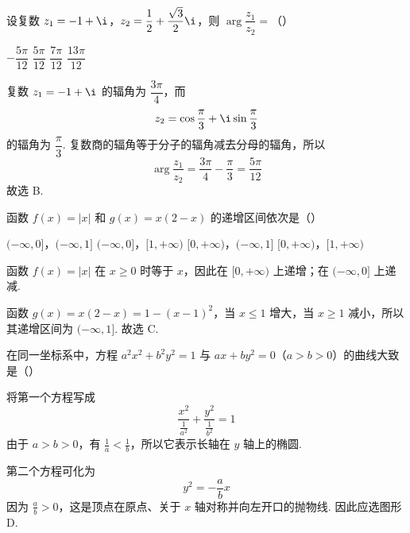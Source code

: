 \begin{problem}
设复数 \(z_1=-1+\i\)，\(z_2=\dfrac{1}{2}+\dfrac{\sqrt{3}}{2}\i\)，则 \(\arg\dfrac{z_1}{z_2}=\)（\quad）

\choices
    {\(-\dfrac{5\pi}{12}\)}
    {\(\dfrac{5\pi}{12}\)}
    {\(\dfrac{7\pi}{12}\)}
    {\(\dfrac{13\pi}{12}\)}

\begin{solution}
复数 \(z_1=-1+\i\) 的辐角为 \(\dfrac{3\pi}{4}\)，而
\[
z_2=\cos\frac{\pi}{3}+\i\sin\frac{\pi}{3}
\]
的辐角为 \(\dfrac{\pi}{3}\). 复数商的辐角等于分子的辐角减去分母的辐角，所以
\[
\arg\frac{z_1}{z_2}=\frac{3\pi}{4}-\frac{\pi}{3}=\frac{5\pi}{12}
\]
故选 B.
\end{solution}
\end{problem}

\begin{problem}
函数 \(f(x)=\lvert x\rvert\) 和 \(g(x)=x(2-x)\) 的递增区间依次是（\quad）

\choices
    {\((-\infty,0]\)，\((-\infty,1]\)}
    {\((-\infty,0]\)，\([1,+\infty)\)}
    {\([0,+\infty)\)，\((-\infty,1]\)}
    {\([0,+\infty)\)，\([1,+\infty)\)}

\begin{solution}
函数 \(f(x)=\lvert x\rvert\) 在 \(x\geqslant0\) 时等于 \(x\)，因此在 \([0,+\infty)\) 上递增；在 \((-\infty,0]\) 上递减.

函数 \(g(x)=x(2-x)=1-(x-1)^2\)，当 \(x\leqslant1\) 增大，当 \(x\geqslant1\) 减小，所以其递增区间为 \((-\infty,1]\). 故选 C.
\end{solution}
\end{problem}

\begin{problem}
在同一坐标系中，方程 \(a^2x^2+b^2y^2=1\) 与 \(ax+by^2=0\)（\(a>b>0\)）的曲线大致是（\quad）

    {}
    {}
    {}

\begin{solution}
将第一个方程写成
\[
\frac{x^2}{\frac{1}{a^2}}+\frac{y^2}{\frac{1}{b^2}}=1
\]
由于 \(a>b>0\)，有 \(\frac{1}{a}<\frac{1}{b}\)，所以它表示长轴在 \(y\) 轴上的椭圆.

第二个方程可化为
\[
y^2=-\frac{a}{b}x
\]
因为 \(\frac{a}{b}>0\)，这是顶点在原点、关于 \(x\) 轴对称并向左开口的抛物线. 因此应选图形 D.
\end{solution}
\end{problem}

